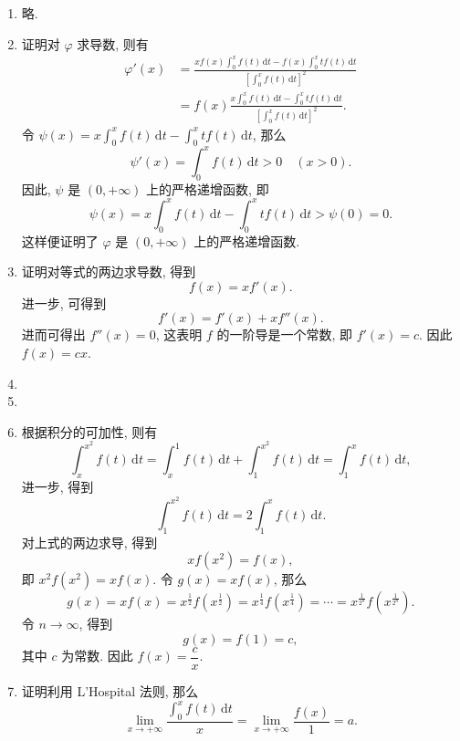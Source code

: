 \documentclass[a4paper, 11pt]{ctexart}
\newcommand{\dif}{\mathrm{d}}
\begin{document}
\begin{enumerate}
    \item %
        略.
    \item %
        {\heiti 证明}\quad 对 $\varphi$ 求导数, 则有
        \begin{align*}
            \varphi'(x) &= \frac{\displaystyle{xf(x)\int_0^x f(t)\,\dif t - f(x)\int_0^x tf(t)\,\dif t}}{\displaystyle{\left[\int_0^x f(t)\,\dif t\right]^2}} \\    
                        &= f(x)\frac{\displaystyle{x\int_0^x f(t)\,\dif t - \int_0^x tf(t)\,\dif t}}{\displaystyle{\left[\int_0^x f(t)\,\dif t\right]^2}}.
        \end{align*}
        令 $\psi(x) = \displaystyle{x\int_0^x f(t)\,\dif t - \int_0^x tf(t)\,\dif t}$, 那么
        \[
            \psi'(x) = \displaystyle{\int_0^x f(t)\,\dif t} > 0\quad (x > 0).    
        \]
        因此, $\psi$ 是 $(0, +\infty)$ 上的严格递增函数, 即
        \[
            \psi(x) = \displaystyle{x\int_0^x f(t)\,\dif t - \int_0^x tf(t)\,\dif t} > \psi(0) = 0.    
        \]
        这样便证明了 $\varphi$ 是 $(0, +\infty)$ 上的严格递增函数.
    \item %
        {\heiti 证明}\quad 对等式的两边求导数, 得到
        \[
            f(x) = xf'(x).    
        \]
        进一步, 可得到
        \[
            f'(x) = f'(x) + xf''(x).    
        \]
        进而可得出 $f''(x) = 0$, 这表明 $f$ 的一阶导是一个常数, 即 $f'(x) = c$. 因此 $f(x) = cx$.
    \item %
    \item %
    \item %
        根据积分的可加性, 则有
        \[
            \int_x^{x^2} f(t)\,\dif t = \int_x^1 f(t)\,\dif t + \int_1^{x^2} f(t)\,\dif t = \int_1^x f(t)\,\dif t,    
        \]
        进一步, 得到
        \[
            \int_1^{x^2} f(t)\,\dif t = 2\int_1^x f(t)\,\dif t.    
        \]
        对上式的两边求导, 得到
        \[
            xf(x^2) = f(x),    
        \]
        即 $x^2f(x^2) = xf(x)$. 令 $g(x) = xf(x)$, 那么
        \[
            g(x) = xf(x) = x^{\frac12}f(x^{\frac12}) = x^{\frac14}f(x^{\frac14}) = \cdots = x^{\frac{1}{2^n}}f(x^{\frac{1}{2^n}}).    
        \]
        令 $n \to \infty$, 得到
        \[
            g(x) = f(1) = c,    
        \]
        其中 $c$ 为常数. 因此 $f(x) = \dfrac{c}{x}$.
    \item %
        {\heiti 证明}\quad 利用 L'Hospital 法则, 那么
        \[
            \lim_{x\to+\infty}\frac{\displaystyle{\int_0^x f(t)\,\dif t}}{x} = \lim_{x\to+\infty} \frac{f(x)}{1} = a.    
        \]
\end{enumerate}
\end{document}
